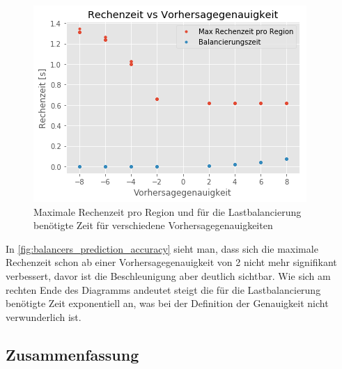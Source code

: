 \begin{figure}
	\centering
	\includegraphics[width=0.9\linewidth]{img/Evaluation/balancers/balancers_prediction_accuracy.png}
	\caption{Maximale Rechenzeit pro Region und für die Lastbalancierung benötigte Zeit für verschiedene Vorhersagegenauigkeiten}
	\label{fig:balancers_prediction_accuracy}
\end{figure}

In \autoref{fig:balancers_prediction_accuracy} sieht man, dass sich die maximale Rechenzeit schon ab einer Vorhersagegenauigkeit von 2 nicht mehr signifikant verbessert, davor ist die Beschleunigung aber deutlich sichtbar.
Wie sich am rechten Ende des Diagramms andeutet steigt die für die Lastbalancierung benötigte Zeit exponentiell an, was bei der Definition der Genauigkeit nicht verwunderlich ist.

%

\subsection{Zusammenfassung}
